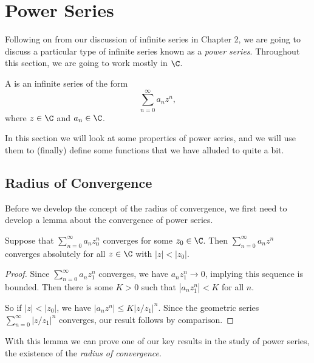 \clearpage
\section{Power Series}

Following on from our discussion of infinite series in Chapter 2, we are going to discuss a particular type of infinite series known as a \emph{power series}. Throughout this section, we are going to work mostly in $\C$.

\begin{definition}
	A  is an infinite series of the form
	$$
		\sum_{n = 0}^{\infty} a_n z^n,
	$$
	where $z \in \C$ and $a_n \in \C$.
\end{definition}

In this section we will look at some properties of power series, and we will use them to (finally) define some functions that we have alluded to quite a bit.

\subsection{Radius of Convergence}

Before we develop the concept of the radius of convergence, we first need to develop a lemma about the convergence of power series. 

\begin{lemma}
Suppose that $\sum_{n = 0}^{\infty} a_n z_0^n$ converges for some $z_0 \in \C$. Then $\sum_{n = 0}^{\infty} a_n z^n$ converges absolutely for all $z\in \C$ with $|z| < |z_0|$.
\end{lemma}
\begin{proof}
Since $\sum_{n = 0}^{\infty} a_n z_1^n$ converges, we have $a_n z_1^n \rightarrow 0$, implying this sequence is bounded.
Then there is some $K > 0$ such that $|a_n z_1^n| < K$ for all $n$.	

So if $|z| < |z_0|$, we have $|a_n z^n| \leq K \left|z/z_1\right|^n$. Since the geometric series $\sum_{n = 0}^{\infty} |z/z_1|^n$ converges, our result follows by comparison.
\end{proof}

With this lemma we can prove one of our key results in the study of power series, the existence of the \emph{radius of convergence}.

